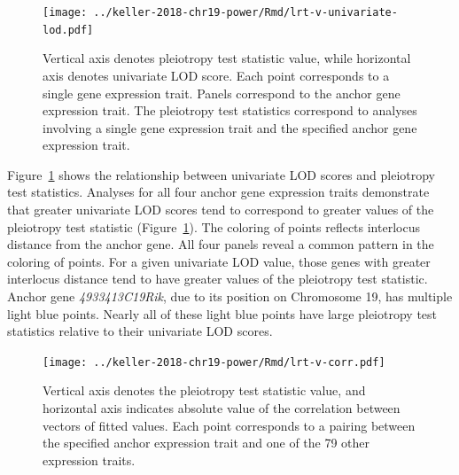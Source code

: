 \documentclass[oneside]{book}\usepackage[]{graphicx}\usepackage[]{color}
\begin{document}
\begin{figure}
    \centering
    \texttt{[image: ../keller-2018-chr19-power/Rmd/lrt-v-univariate-lod.pdf]}
    \caption[Pleiotropy LRT vs. univariate LOD score plots reveal that greater univariate LOD scores (and greater interlocus distance) tend to correspond to greater pleiotropy LRT values.]{Vertical axis denotes pleiotropy test statistic value, while horizontal axis denotes univariate LOD score. Each point corresponds to a single gene expression trait. Panels correspond to the anchor gene expression trait. The pleiotropy test statistics correspond to analyses involving a single gene expression trait and the specified anchor gene expression trait.}
    \label{fig:lod}
\end{figure}

Figure~\ref{fig:lod} shows the relationship between univariate LOD scores and pleiotropy test statistics. Analyses for all four anchor gene expression traits demonstrate that greater univariate LOD
scores tend to correspond to greater values of the pleiotropy test statistic (Figure~\ref{fig:lod}). 
The coloring of points reflects interlocus distance from the anchor gene. 
All four panels reveal a common pattern in the coloring of points.
For a given univariate LOD value, those genes with greater interlocus distance 
tend to have greater values of the pleiotropy test statistic. 
Anchor gene \emph{4933413C19Rik}, due to its position on Chromosome 19, has multiple light blue points. 
Nearly all of these light blue points have large pleiotropy test
statistics relative to their univariate LOD scores.




\begin{figure}
    \centering
    \texttt{[image: ../keller-2018-chr19-power/Rmd/lrt-v-corr.pdf]}
    \caption[Pleiotropy LRT vs. fitted values correlations plots reveal little evidence for a relationship.]{Vertical axis denotes the pleiotropy test statistic value, and horizontal axis indicates absolute value of the correlation between vectors of fitted values. Each point corresponds to a pairing between the specified anchor expression trait and one of the 79 other expression traits.}
    \label{fig:cor}
\end{figure}
\end{document}
